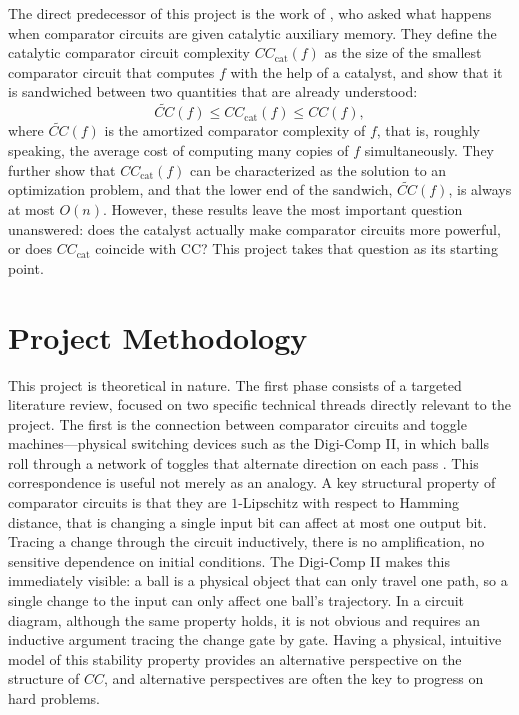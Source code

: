 \documentclass[12pt]{article}
\newcommand{\CCC}{CC_\text{cat}}
\begin{document}
The direct predecessor of this project is the work of \textcite{RobreZuiddam2021}, who asked what happens when comparator circuits are given catalytic auxiliary memory. They define the catalytic comparator circuit complexity $\CCC(f)$ as the size of the smallest comparator circuit that computes $f$ with the help of a catalyst, and show that it is sandwiched between two quantities that are already understood:
\[\widetilde{CC}(f) \leq \CCC(f) \leq CC(f),\]
where $\widetilde{CC}(f)$ is the amortized comparator complexity of $f$, that is, roughly speaking, the average cost of computing many copies of $f$ simultaneously. They further show that $\CCC(f)$ can be characterized as the solution to an optimization problem, and that the lower end of the sandwich, $\widetilde{CC}(f)$, is always at most $O(n)$. However, these results leave the most important question unanswered: does the catalyst actually make comparator circuits more powerful, or does $\CCC$ coincide with CC? This project takes that question as its starting point.



\section{Project Methodology}

This project is theoretical in nature. The first phase consists of a targeted literature review, focused on two specific technical threads directly relevant to the project. The first is the connection between 
comparator circuits and toggle machines---physical switching devices such as the Digi-Comp II, in which balls roll through a network of toggles that 
alternate direction on each pass \autocite{Aaronson2014}. This correspondence 
is useful not merely as an analogy. A key structural property of comparator circuits is that they are $1$-Lipschitz with respect to Hamming distance, that is changing a single input bit can affect at most one output bit. Tracing a change through the circuit inductively, there is no amplification, no sensitive dependence on initial conditions. The Digi-Comp II makes this immediately visible: a ball is a physical object that can only travel one path, so a single change to the input can only affect one ball's trajectory. In a circuit diagram, although the same property holds, it is not obvious and requires an inductive argument tracing the change gate by gate. Having a physical, intuitive model of this stability property provides an alternative perspective on the structure of $CC$, and alternative perspectives are often the key to progress on hard problems. 
\end{document}
